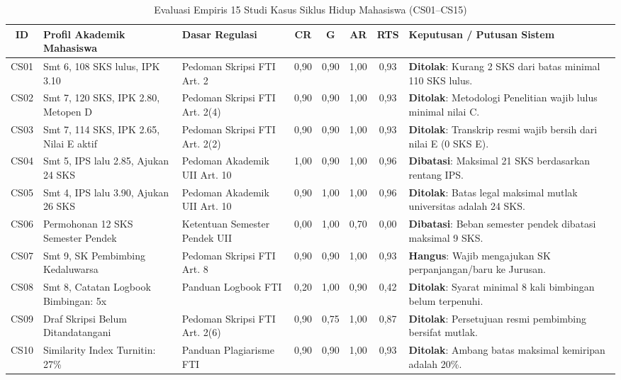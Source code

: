 \documentclass[conference]{IEEEtran}
\begin{document}
\begin{table}[htbp]
\caption{Evaluasi Empiris 15 Studi Kasus Siklus Hidup Mahasiswa (CS01--CS15)}
\label{tab:studycases}
\centering
\footnotesize
\begin{tabularx}{\textwidth}{c p{3.8cm} p{3.5cm} cccc X}
\toprule
\textbf{ID} & \textbf{Profil Akademik Mahasiswa} & \textbf{Dasar Regulasi} & \textbf{CR} & \textbf{G} & \textbf{AR} & \textbf{RTS} & \textbf{Keputusan / Putusan Sistem} \\
\midrule
CS01 & Smt 6, 108 SKS lulus, IPK 3.10 & Pedoman Skripsi FTI Art. 2 & 0,90 & 0,90 & 1,00 & 0,93 & \textbf{Ditolak}: Kurang 2 SKS dari batas minimal 110 SKS lulus. \\
CS02 & Smt 7, 120 SKS, IPK 2.80, Metopen D & Pedoman Skripsi FTI Art. 2(4) & 0,90 & 0,90 & 1,00 & 0,93 & \textbf{Ditolak}: Metodologi Penelitian wajib lulus minimal nilai C. \\
CS03 & Smt 7, 114 SKS, IPK 2.65, Nilai E aktif & Pedoman Skripsi FTI Art. 2(2) & 0,90 & 0,90 & 1,00 & 0,93 & \textbf{Ditolak}: Transkrip resmi wajib bersih dari nilai E (0 SKS E). \\
CS04 & Smt 5, IPS lalu 2.85, Ajukan 24 SKS & Pedoman Akademik UII Art. 10 & 1,00 & 0,90 & 1,00 & 0,96 & \textbf{Dibatasi}: Maksimal 21 SKS berdasarkan rentang IPS. \\
CS05 & Smt 4, IPS lalu 3.90, Ajukan 26 SKS & Pedoman Akademik UII Art. 10 & 0,90 & 1,00 & 1,00 & 0,96 & \textbf{Ditolak}: Batas legal maksimal mutlak universitas adalah 24 SKS. \\
CS06 & Permohonan 12 SKS Semester Pendek & Ketentuan Semester Pendek UII & 0,00 & 1,00 & 0,70 & 0,00 & \textbf{Dibatasi}: Beban semester pendek dibatasi maksimal 9 SKS. \\
CS07 & Smt 9, SK Pembimbing Kedaluwarsa & Pedoman Skripsi FTI Art. 8 & 0,90 & 0,90 & 1,00 & 0,93 & \textbf{Hangus}: Wajib mengajukan SK perpanjangan/baru ke Jurusan. \\
CS08 & Smt 8, Catatan Logbook Bimbingan: 5x & Panduan Logbook FTI & 0,20 & 1,00 & 0,90 & 0,42 & \textbf{Ditolak}: Syarat minimal 8 kali bimbingan belum terpenuhi. \\
CS09 & Draf Skripsi Belum Ditandatangani & Pedoman Skripsi FTI Art. 2(6) & 0,90 & 0,75 & 1,00 & 0,87 & \textbf{Ditolak}: Persetujuan resmi pembimbing bersifat mutlak. \\
CS10 & Similarity Index Turnitin: 27\% & Panduan Plagiarisme FTI & 0,90 & 0,90 & 1,00 & 0,93 & \textbf{Ditolak}: Ambang batas maksimal kemiripan adalah 20\%. \\

\end{tabularx}
\end{table}
\end{document}
